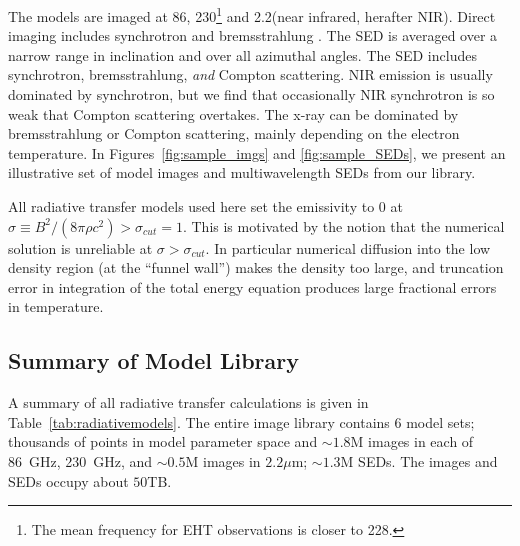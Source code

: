 The models are imaged at 86\GHz, 230\GHz\footnote{The mean frequency for  EHT observations is closer to 228\GHz.} and 2.2\um (near infrared, herafter NIR).
Direct imaging includes synchrotron and bremsstrahlung \citep[both ion-electron and electron-electron; see][for a recent review]{2020ApJ...898...50Y}.
The SED is averaged over a narrow range in inclination and over all azimuthal angles.
The SED includes synchrotron, bremsstrahlung, \emph{and} Compton scattering.
NIR emission is usually dominated by synchrotron, but we find that occasionally NIR synchrotron is so weak that Compton scattering overtakes.
The x-ray can be dominated by bremsstrahlung or Compton scattering, mainly depending on the electron temperature.
In Figures~\ref{fig:sample_imgs} and \ref{fig:sample_SEDs}, we present an illustrative set of model images and multiwavelength SEDs from our library.

All radiative transfer models used here set the emissivity to $0$ at $\sigma \equiv B^2/(8\pi\rho c^2) > \sigma_{cut} = 1$.  This is motivated by the notion that the numerical solution is unreliable at $\sigma > \sigma_{cut}$.  In particular numerical diffusion into the low density region (at the ``funnel wall'') makes the density too large, and truncation error in integration of the total energy equation produces large fractional errors in temperature.

\subsection{Summary of \sgra Model Library}


A summary of all radiative transfer calculations is given in Table~\ref{tab:radiativemodels}. The entire image library
contains $6$ model sets; thousands of points in model parameter space and
$\sim 1.8$M images in each of 86~GHz, 230~GHz, and $\sim0.5$M images in $2.2\mu$m;
$\sim1.3$M SEDs.  The images and SEDs occupy about $50$TB.

